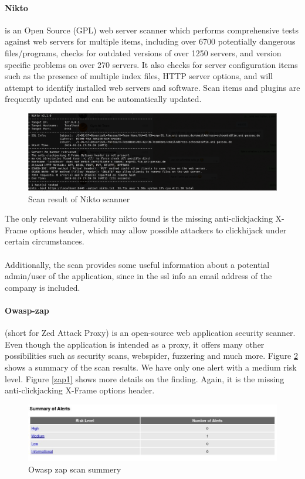 \documentclass{scrreprt}
\begin{document}
\paragraph{Nikto}
is an Open Source (GPL) web server scanner which performs comprehensive tests against web servers for multiple items, including over 6700 potentially dangerous files/programs, checks for outdated versions of over 1250 servers, and version specific problems on over 270 servers. It also checks for server configuration items such as the presence of multiple index files, HTTP server options, and will attempt to identify installed web servers and software. Scan items and plugins are frequently updated and can be automatically updated.
\begin{figure}[h!]
	\centering
	\includegraphics[width=15cm]{report/nikto.png}
	\caption{Scan result of Nikto scanner}
	\label{nikto}
\end{figure}

\noindent The only relevant vulnerability nikto found is the missing anti-clickjacking X-Frame options header, which may allow possible attackers to clickhijack under certain circumstances. \\
 \\
Additionally, the scan provides some useful information about a potential admin/user of the application, since in the ssl info an email address of the company is included.

\paragraph{Owasp-zap}
(short for Zed Attack Proxy) is an open-source web application security scanner. Even though the application is intended as a proxy, it offers many other possibilities such as security scans, webspider, fuzzering and much more. Figure \ref{zap} shows a summary of the scan results. We have only one alert with a medium risk level. Figure \ref{zap1} shows more details on the finding. Again, it is the missing anti-clickjacking X-Frame options header. 
\begin{figure}[h!]
	\centering
	\includegraphics[width=15cm]{report/owasp0.jpg}
	\caption{Owasp zap scan summery}
	\label{zap}
\end{figure}
\end{document}
